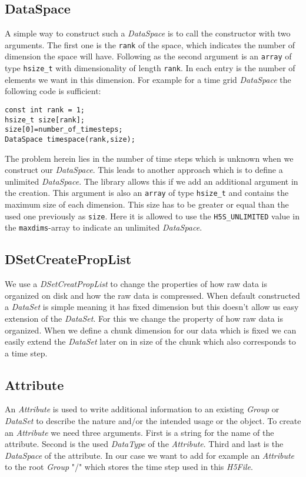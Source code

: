 \documentclass{article}
\begin{document}
\subsection{DataSpace}
 A simple way to construct such a \textit{DataSpace} is to call the constructor with two arguments. The first one is the \texttt{rank} of the space, which indicates the number of dimension the space will have. Following as the second argument is an \texttt{array} of type \texttt{hsize\_t} with dimensionality of length \texttt{rank}. In each entry is the number of elements we want in this dimension. For example for a time grid \textit{DataSpace} the following code is sufficient:\\

\begin{lstlisting}
const int rank = 1;
hsize_t size[rank];
size[0]=number_of_timesteps;
DataSpace timespace(rank,size);
\end{lstlisting}
The problem herein lies in the number of time steps which is unknown when we construct our \textit{DataSpace}. This leads to another approach which is to define a unlimited \textit{DataSpace}. The library allows this if we add an additional argument in the creation. This argument is also an \texttt{array} of type \texttt{hsize\_t} and contains the maximum size of each dimension. This size has to be greater or equal than the used one previously as \texttt{size}. Here it is allowed to use the \texttt{H5S\_UNLIMITED} value in the \texttt{maxdims}-array to indicate an unlimited \textit{DataSpace}.

\subsection{DSetCreatePropList}
We use a \textit{DSetCreatPropList} to change the properties of how raw data is organized on disk and how the raw data is compressed. When default constructed a \textit{DataSet} is simple meaning it has fixed dimension but this doesn't allow us easy extension of the \textit{DataSet}. For this we change the property of how raw data is organized. When we define a chunk dimension for our data which is fixed we can easily extend the \textit{DataSet} later on in size of the chunk which also corresponds to a time step.
\subsection{Attribute}
An \textit{Attribute} is used to write additional information to an existing \textit{Group} or \textit{DataSet} to describe the nature and/or the intended usage or the object. To create an \textit{Attribute} we need three arguments. First is a string for the name of the attribute. Second is the used \textit{DataType} of the \textit{Attribute}. Third and last is the \textit{DataSpace} of the attribute. In our case we want to add for example an \textit{Attribute} to the root \textit{Group} "/" which stores the time step used in this \textit{H5File}.
\end{document}
